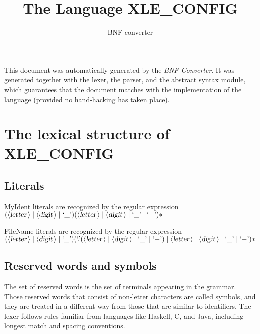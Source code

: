\documentclass[a4paper,11pt]{article}
\author{BNF-converter}
\title{The Language XLE_CONFIG}
\begin{document}
\maketitle

\newcommand{\emptyP}{\mbox{$\epsilon$}}
\newcommand{\terminal}[1]{\mbox{{\texttt {#1}}}}
\newcommand{\nonterminal}[1]{\mbox{$\langle \mbox{{\sl #1 }} \! \rangle$}}
\newcommand{\arrow}{\mbox{::=}}
\newcommand{\delimit}{\mbox{$|$}}
\newcommand{\reserved}[1]{\mbox{{\texttt {#1}}}}
\newcommand{\literal}[1]{\mbox{{\texttt {#1}}}}
\newcommand{\symb}[1]{\mbox{{\texttt {#1}}}}

This document was automatically generated by the {\em BNF-Converter}. It was generated together with the lexer, the parser, and the abstract syntax module, which guarantees that the document matches with the implementation of the language (provided no hand-hacking has taken place).

\section*{The lexical structure of XLE_CONFIG}

\subsection*{Literals}



MyIdent literals are recognized by the regular expression
\(({\nonterminal{letter}} \mid {\nonterminal{digit}} \mid \mbox{`\_'}) ({\nonterminal{letter}} \mid {\nonterminal{digit}} \mid \mbox{`\_'} \mid \mbox{`{$-$}'})*\)

FileName literals are recognized by the regular expression
\(({\nonterminal{letter}} \mid {\nonterminal{digit}} \mid \mbox{`\_'}) (\mbox{`.'} ({\nonterminal{letter}} \mid {\nonterminal{digit}} \mid \mbox{`\_'} \mid \mbox{`{$-$}'}) \mid {\nonterminal{letter}} \mid {\nonterminal{digit}} \mid \mbox{`\_'} \mid \mbox{`{$-$}'})*\)


\subsection*{Reserved words and symbols}
The set of reserved words is the set of terminals appearing in the grammar. Those reserved words that consist of non-letter characters are called symbols, and they are treated in a different way from those that are similar to identifiers. The lexer follows rules familiar from languages like Haskell, C, and Java, including longest match and spacing conventions.
\end{document}
